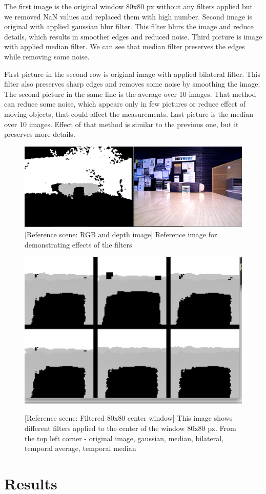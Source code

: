 \documentclass[11pt]{article}
\begin{document}
The first image is the original window 80x80 px without any filters applied but
we removed NaN values and replaced them with high number. Second image is
original with applied gaussian blur filter. This filter blurs the image and
reduce details, which results in smoother edges and reduced noise. Third picture
is image with applied median filter. We can see that median filter preserves the
edges while removing some noise. \par

First picture in the second row is original image with applied bilateral
filter. This filter also preserves sharp edges and removes some noise by
smoothing the image. The second picture in the same line is the average over 10
images. That method can reduce some noise, which appears only in few pictures or
reduce effect of moving objects, that could affect the measurements. Last
picture is the median over 10 images. Effect of that method is similar
to the previous one, but it preserves more details.

\begin{figure}[ht]
  \centering
  \includegraphics[width=1\textwidth]{figures/reference_rgb_depth.png}
  [Reference scene: RGB and depth
  image]{\label{fig:refimage} Reference image for demonstrating effects of the
    filters}
\end{figure}
\begin{figure}[ht]
  \centering
  \includegraphics[width=1\textwidth]{figures/applied_filters_center.png}
  
  [Reference scene: Filtered 80x80 center
  window]{\label{fig:filterswindow} This image shows different filters applied
    to the center of the window 80x80 px. From the top left corner - original
    image, gaussian, median, bilateral, temporal average, temporal median}
\end{figure}

\section{Results}


\end{document}
